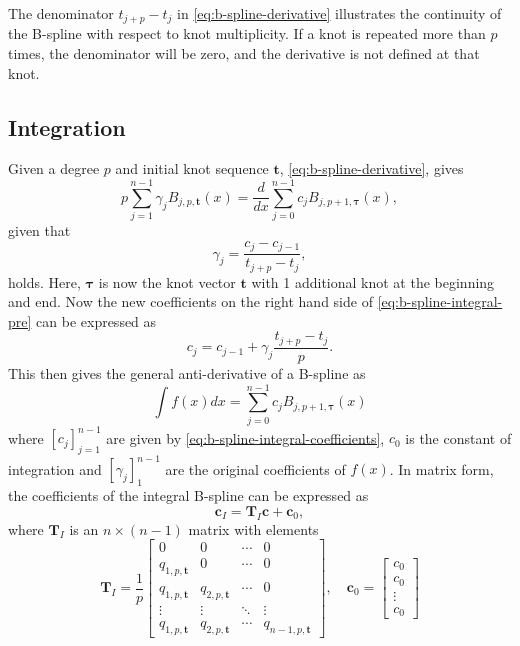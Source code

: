 The denominator $t_{j+p}-t_j$ in \cref{eq:b-spline-derivative} illustrates the continuity of the B-spline with respect to knot multiplicity. If a knot is repeated more than $p$ times, the denominator will be zero, and the derivative is not defined at that knot.

\subsection{Integration}
Given a degree $p$ and initial knot sequence $\mathbf t$, \cref{eq:b-spline-derivative}, gives
\begin{equation}\label{eq:b-spline-integral-pre}
    p \sum_{j=1}^{n-1} \gamma_j B_{j, p, \boldsymbol{t}}(x) 
    = \frac{d}{dx} \sum_{j=0}^{n-1} c_j B_{j, p+1, \boldsymbol{\tau}}(x),
\end{equation}
given that
\begin{equation}
    \gamma_j = \frac{c_j-c_{j-1}}{t_{j+p}-t_j},
\end{equation}
holds. Here, $\boldsymbol{\tau}$ is now the knot vector $\mathbf{t}$ with 1 additional knot at the beginning and end. Now
the new coefficients on the right hand side of \cref{eq:b-spline-integral-pre} can be expressed as 
\begin{equation}\label{eq:b-spline-integral-coefficients}
    c_j = c_{j-1} + \gamma_j \frac{t_{j+p}-t_j}{p}.
\end{equation}
This then gives the general anti-derivative of a B-spline as
\begin{equation}\label{eq:b-spline-integral}
    \int f(x) dx = \sum_{j=0}^{n-1} c_j B_{j, p+1, \boldsymbol{\tau}}(x)
\end{equation}
where $[c_j]_{j=1}^{n-1}$ are given by \cref{eq:b-spline-integral-coefficients}, $c_0$ is the constant of integration and $[\gamma_j]_1^{n-1}$ are the original coefficients of $f(x)$. In matrix form, the coefficients of the integral B-spline can be expressed as
\begin{equation}\label{eq:b-spline-integral-matrix}
    \mathbf{c}_I = \mathbf T_I \mathbf{c} + \mathbf{c}_0,
\end{equation}
where $\mathbf T_I$ is an $n \times (n-1)$ matrix with elements
\begin{equation}
    \mathbf T_I = \frac{1}{p}\begin{bmatrix}
        0 & 0 & \cdots & 0 \\
        q_{1,p,\mathbf{t}} & 0 & \cdots & 0 \\
        q_{1,p,\mathbf{t}} & q_{2,p,\mathbf{t}} & \cdots & 0 \\
        \vdots & \vdots & \ddots & \vdots \\
        q_{1,p,\mathbf{t}} & q_{2,p,\mathbf{t}} & \cdots & q_{n-1,p,\mathbf{t}}
    \end{bmatrix},\quad
    \mathbf{c}_0 = \begin{bmatrix}
        c_0 \\
        c_0 \\
        \vdots \\
        c_0
    \end{bmatrix}
\end{equation}

